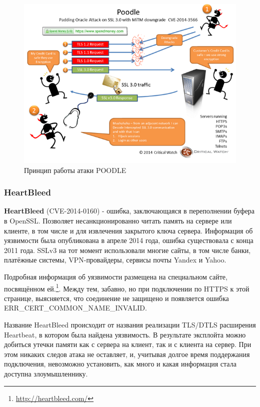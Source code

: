 \documentclass[a4paper]{article}
\begin{document}
\begin{figure}[H]
	\begin{center}
		\includegraphics[scale=0.7]{pics/poodle.png}
		\caption{Принцип работы атаки POODLE} 
		\label{pic:pic_name}
	\end{center}
\end{figure}


\subsubsection{HeartBleed}

\textbf{HeartBleed} (CVE-2014-0160) - ошибка, заключающаяся в переполнении буфера в OpenSSL. Позволяет несанкционированно читать память на сервере или клиенте, в том числе и для извлечения закрытого ключа сервера. Информация об уязвимости была опубликована в апреле 2014 года, ошибка существовала с конца 2011 года. SSLv3 на тот момент использовали многие сайты, в том числе банки, платёжные системы, VPN-провайдеры, сервисы почты Yandex и Yahoo.

Подробная информация об уязвимости размещена на специальном сайте, посвящённом ей.\footnote{\url{http://heartbleed.com/}}. Между тем, забавно, но при подключении по HTTPS к этой странице, выясняется, что соединение не защищено и появляется ошибка ERR\_CERT\_COMMON\_NAME\_INVALID.

Название HeartBleed происходит от названия реализации TLS/DTLS расширения Heartbeat, в котором была найдена уязвимость. В результате эксплойта можно добиться утечки памяти как с сервера на клиент, так и с клиента на сервер. При этом никаких следов атака не оставляет, и, учитывая долгое время поддержания подключения, невозможно установить, как много и какая информация стала доступна злоумышленнику.
\end{document}

